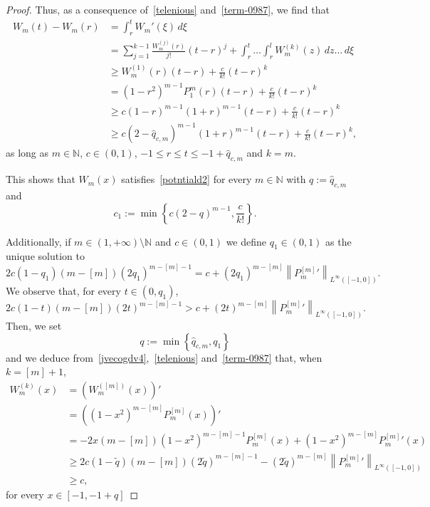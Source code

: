 \documentclass[10pt,a4paper]{amsart}
\newcommand{\N}{\mathbb{N}}
\renewcommand{\geq}{\geqslant}
\renewcommand{\leq}{\leqslant}
\begin{document}
\begin{proof}
Thus, as a consequence of~\eqref{telenious} and~\eqref{term-0987},
we find that 
\begin{equation*}
\begin{split}
W_m(t)-W_m(r)&=\int_{r}^tW_m'(\xi)\,d\xi\\
&=\sum_{j=1}^{k-1} \frac{W_m^{(j)}(r)}{j!}(t-r)^j+\int_{r}^t\dots \int_{r}^l W_m^{(k)}(z)\,dz\dots\,d\xi\\
&\geq W_m^{(1)}(r)(t-r)  + \frac{c}{k!}(t-r)^k\\
&=(1-r^2)^{m-1}P_1^m(r)(t-r)+\frac{c}{k!}(t-r)^k\\
&\geq c(1-r)^{m-1}(1+r)^{m-1}(t-r)+\frac{c}{k!}(t-r)^k\\
&\geq c(2-\hat{q}_{c,m})^{m-1}(1+r)^{m-1}(t-r)+\frac{c}{k!}(t-r)^k,
\end{split}
\end{equation*}
as long as $m\in \N$, $c\in (0,1)$, $-1\leq r\leq t\leq -1+\hat{q}_{c,m}$ and $k=m$.

This shows that $W_m(x)$ satisfies~\eqref{potntiald2} for every $m\in\N$  with $q:=\hat{q}_{c,m}$ and 
\begin{equation}\label{c_1}
c_1:=\min\left\lbrace  c(2-q)^{m-1} ,\frac{c}{k!}    \right\rbrace.
\end{equation}

Additionally, if $m\in (1,+\infty)\setminus \N$ and $c\in (0,1)$ we define $q_1\in (0,1)$ as the unique solution to 
\begin{equation*}
2c(1-q_1)(m-\left[m\right])(2 q_1)^{m-\left[m\right]-1} =c+ (2 q_1)^{m-\left[m\right]}\left\|{P_m^{\left[m\right]}}'\right\|_{L^\infty([-1,0])}.
\end{equation*}
We observe that, for every $t\in (0,q_1)$, 
\begin{equation}\label{jvecogdv4}
2c(1-t)(m-\left[m\right])(2 t)^{m-\left[m\right]-1}>c+ (2 t)^{m-\left[m\right]}\left\|{P_m^{\left[m\right]}}'\right\|_{L^\infty([-1,0])}.
\end{equation}
Then, we set  
\begin{equation}\label{eq!}
q:=\min \left\lbrace \hat{q}_{c,m}, q_1  \right\rbrace
\end{equation}
and we deduce from~\eqref{jvecogdv4},~\eqref{telenious} and~\eqref{term-0987} that,
when $k=\left[m\right]+1$,
\begin{equation*}
\begin{split}
W_m^{(k)}(x)&=\left(W_m^{([m])}(x)\right)'\\
&=\left((1-x^2)^{m-\left[m\right]}P_m^{\left[m\right]}(x)\right)'\\
&=-2x(m-\left[m\right])\left(1-x^2\right)^{m-\left[m\right]-1}P_m^{\left[m\right]}(x)+ (1-x^2)^{m-\left[m\right]}{P_m^{\left[m\right]}}'(x)\\
&\geq 2c(1-\tilde{q})(m-\left[m\right])(2\tilde{q})^{m-\left[m\right]-1}-(2\tilde{q})^{m-\left[m\right]}\left\|{P_m^{\left[m\right]}}'\right\|_{L^\infty([-1,0])}\\
&\geq c,
\end{split}
\end{equation*}
for every $x\in [-1,-1+q]$


\end{proof}
\end{document}
